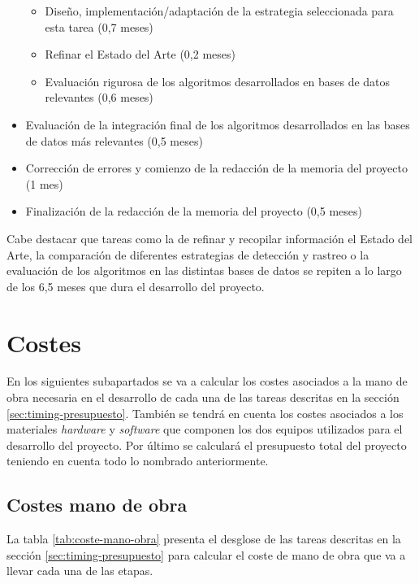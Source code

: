 \begin{itemize}
    \begin{itemize}
        \item Diseño, implementación/adaptación de la estrategia seleccionada para esta tarea (0,7 meses)
        \item Refinar el Estado del Arte (0,2 meses)
        \item Evaluación rigurosa de los algoritmos desarrollados en bases de datos relevantes (0,6 meses)
    \end{itemize}
    
    \item Evaluación de la integración final de los algoritmos desarrollados en las bases de datos más relevantes (0,5 meses)
    
    \item Corrección de errores y comienzo de la redacción de la memoria del proyecto (1 mes)
    
    \item Finalización de la redacción de la memoria del proyecto (0,5 meses)
\end{itemize}

Cabe destacar que tareas como la de refinar y recopilar información el Estado del Arte, la comparación de diferentes estrategias de detección y rastreo o la evaluación de los algoritmos en las distintas bases de datos se repiten a lo largo de los 6,5 meses que dura el desarrollo del proyecto.

\section{Costes}
\label{sec:costes-presupuesto}

En los siguientes subapartados se va a calcular los costes asociados a la mano de obra necesaria en el desarrollo de cada una de las tareas descritas en la sección \ref{sec:timing-presupuesto}. También se tendrá en cuenta los costes asociados a los materiales \textit{hardware} y \textit{software} que componen los dos equipos utilizados para el desarrollo del proyecto. Por último se calculará el presupuesto total del proyecto teniendo en cuenta todo lo nombrado anteriormente.

\subsection{Costes mano de obra}
\label{subsec:costes-mano-obra}

La tabla \ref{tab:coste-mano-obra} presenta el desglose de las tareas descritas en la sección \ref{sec:timing-presupuesto} para calcular el coste de mano de obra que va a llevar cada una de las etapas.


